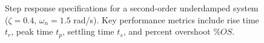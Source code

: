 \begin{figure}[htbp]
\begin{tikzpicture}
\end{tikzpicture}
\caption{Step response specifications for a second-order underdamped system ($\zeta = 0.4$, $\omega_n = 1.5$ rad/s). Key performance metrics include rise time $t_r$, peak time $t_p$, settling time $t_s$, and percent overshoot $\%OS$.}
\label{fig:step_response_specs}
\end{figure}
